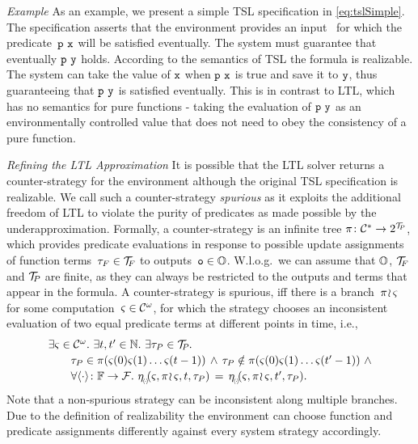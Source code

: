 \noindent \textit{Example} As an example, we present a simple TSL specification in \cref{eq:tslSimple}.
The specification asserts that the environment provides an input~ for which the predicate~$ {\text{\texttt{p}}}~{\text{\texttt{x}}} $ will be satisfied eventually. The system must guarantee that eventually $ {\text{\texttt{p}}}~{\text{\texttt{y}}} $ holds.
According to the semantics of TSL the formula is realizable. The system can take the value of $ {\text{\texttt{x}}} $ when $ {\text{\texttt{p}}}~{\text{\texttt{x}}} $ is true and save it to $ {\text{\texttt{y}}} $, thus guaranteeing that $ {\text{\texttt{p}}}~{\text{\texttt{y}}} $ is satisfied eventually.
This is in contrast to LTL, which has no semantics for pure functions - taking the evaluation of $ {\text{\texttt{p}}}~{\text{\texttt{y}}} $ as an environmentally controlled value that does not need to obey the consistency of a pure function.

\medskip

\noindent \textit{Refining the LTL Approximation} It is possible that the LTL solver returns a counter-strategy for the environment although the original TSL specification is realizable.
We call such a counter-strategy \textit{spurious} as it exploits the additional freedom of LTL to violate the purity of predicates as made possible by the underapproximation.
Formally, a counter-strategy is an infinite tree $ \pi \colon \mathcal{C}^{*} \rightarrow 2^{\mathcal{T}_{\!P\hspace{-0.5pt}}} $, which provides predicate evaluations in response to possible update assignments of function terms~$ \tau_{F} \in \mathcal{T}_{\!F\hspace{-0.5pt}} $ to outputs~$ {\text{\texttt{o}}} \in \mathbb{O} $.
W.l.o.g.\ we can assume that $ \mathbb{O} $, $ \mathcal{T}_{\!F\hspace{-0.5pt}} $ and $ \mathcal{T}_{\!P\hspace{-0.5pt}} $ are finite, as they can always be restricted to the outputs and terms that appear in the formula.
A counter-strategy is spurious, iff there is a branch~$ \pi \! \wr \hspace{-0.6pt} \varsigma $ for some computation~$ \varsigma \in \mathcal{C}^{\omega} $, for which the strategy chooses an inconsistent evaluation of two equal predicate terms at different points in time, i.e.,
%
\begin{equation*}
  \begin{array}{l}
    \exists \comp \in \comps^{\omega}. \ \exists t, t' \in \dtime. \ \exists \pterm \in \pterms. \\[0.2em]
    \qquad \pterm \in \pi(\comp(0)\comp(1)\ldots\comp(t-1)) \, \wedge \, \pterm \notin \pi(\comp(0)\comp(1)\ldots\comp(t'-1)) \ \wedge \\[0.2em]
    \qquad \forall \assign{\cdot} \from \fnames \to \functions. \ \eval(\comp, \branch{\pi}{\comp}, t, \pterm) \, = \, \eval(\comp, \branch{\pi}{\comp}, t', \pterm).
  \end{array}
\end{equation*}
%
Note that a non-spurious strategy can be inconsistent along multiple
branches. Due to the definition of realizability
the environment can choose function and
predicate assignments differently against every system strategy
accordingly.

